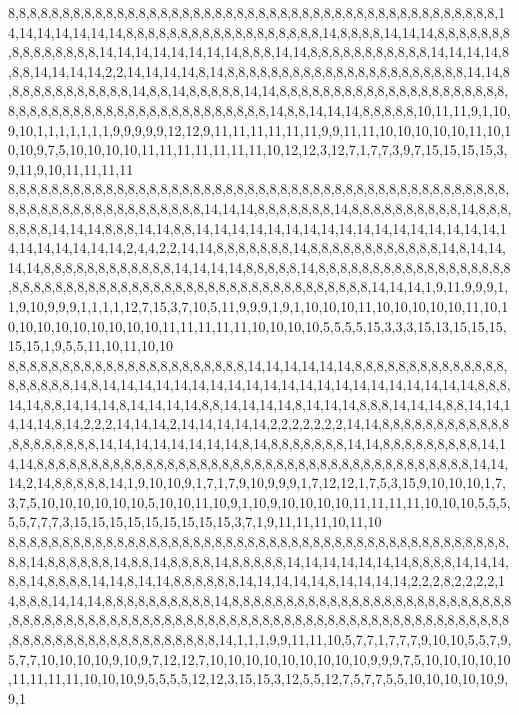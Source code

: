 8,8,8,8,8,8,8,8,8,8,8,8,8,8,8,8,8,8,8,8,8,8,8,8,8,8,8,8,8,8,8,8,8,8,8,8,8,8,8,8,8,8,8,8,8,14,14,14,14,14,14,14,8,8,8,8,8,8,8,8,8,8,8,8,8,8,8,8,8,8,14,8,8,8,8,14,14,14,8,8,8,8,8,8,8,8,8,8,8,8,8,8,8,14,14,14,14,14,14,14,14,8,8,8,14,14,8,8,8,8,8,8,8,8,8,8,8,14,14,14,14,8,8,8,14,14,14,14,2,2,14,14,14,14,8,14,8,8,8,8,8,8,8,8,8,8,8,8,8,8,8,8,8,8,8,8,8,8,14,14,8,8,8,8,8,8,8,8,8,8,8,8,14,8,8,14,8,8,8,8,8,14,14,8,8,8,8,8,8,8,8,8,8,8,8,8,8,8,8,8,8,8,8,8,8,8,8,8,8,8,8,8,8,8,8,8,8,8,8,8,8,8,8,8,8,8,8,8,14,8,8,14,14,14,8,8,8,8,8,10,11,11,9,1,10,9,10,1,1,1,1,1,1,1,9,9,9,9,9,12,12,9,11,11,11,11,11,11,9,9,11,11,10,10,10,10,10,11,10,10,10,9,7,5,10,10,10,10,11,11,11,11,11,11,11,10,12,12,3,12,7,1,7,7,3,9,7,15,15,15,15,3,9,11,9,10,11,11,11,11
8,8,8,8,8,8,8,8,8,8,8,8,8,8,8,8,8,8,8,8,8,8,8,8,8,8,8,8,8,8,8,8,8,8,8,8,8,8,8,8,8,8,8,8,8,8,8,8,8,8,8,8,8,8,8,8,8,8,8,8,8,8,8,8,14,14,14,8,8,8,8,8,8,8,14,8,8,8,8,8,8,8,8,8,8,14,8,8,8,8,8,8,8,14,14,14,8,8,8,14,14,8,8,14,14,14,14,14,14,14,14,14,14,14,14,14,14,14,14,14,14,14,14,14,14,14,14,2,4,4,2,2,14,14,8,8,8,8,8,8,8,14,8,8,8,8,8,8,8,8,8,8,8,8,14,8,14,14,14,14,8,8,8,8,8,8,8,8,8,8,8,8,14,14,14,14,8,8,8,8,8,14,8,8,8,8,8,8,8,8,8,8,8,8,8,8,8,8,8,8,8,8,8,8,8,8,8,8,8,8,8,8,8,8,8,8,8,8,8,8,8,8,8,8,8,8,8,8,8,8,8,8,8,14,14,14,1,9,11,9,9,9,1,1,9,10,9,9,9,1,1,1,1,12,7,15,3,7,10,5,11,9,9,9,1,9,1,10,10,10,11,10,10,10,10,10,11,10,10,10,10,10,10,10,10,10,10,11,11,11,11,11,10,10,10,10,5,5,5,5,15,3,3,3,15,13,15,15,15,15,15,1,9,5,5,11,10,11,10,10
8,8,8,8,8,8,8,8,8,8,8,8,8,8,8,8,8,8,8,8,8,8,14,14,14,14,14,14,8,8,8,8,8,8,8,8,8,8,8,8,8,8,8,8,8,8,8,8,14,8,14,14,14,14,14,14,14,14,14,14,14,14,14,14,14,14,14,14,14,14,14,8,8,8,14,14,8,8,14,14,14,8,14,14,14,14,8,8,14,14,14,14,8,14,14,14,8,8,8,14,14,14,8,8,14,14,14,14,14,8,14,2,2,2,14,14,14,2,14,14,14,14,14,2,2,2,2,2,2,2,14,14,8,8,8,8,8,8,8,8,8,8,8,8,8,8,8,8,8,8,8,8,14,14,14,14,14,14,14,14,8,14,8,8,8,8,8,8,8,14,14,8,8,8,8,8,8,8,8,8,14,14,14,8,8,8,8,8,8,8,8,8,8,8,8,8,8,8,8,8,8,8,8,8,8,8,8,8,8,8,8,8,8,8,8,8,8,8,8,8,8,8,8,14,14,14,2,14,8,8,8,8,8,14,1,9,10,10,9,1,7,1,7,9,10,9,9,9,1,7,12,12,1,7,5,3,15,9,10,10,10,1,7,3,7,5,10,10,10,10,10,10,5,10,10,11,10,9,1,10,9,10,10,10,10,11,11,11,11,10,10,10,5,5,5,5,5,7,7,7,3,15,15,15,15,15,15,15,15,15,3,7,1,9,11,11,11,10,11,10
8,8,8,8,8,8,8,8,8,8,8,8,8,8,8,8,8,8,8,8,8,8,8,8,8,8,8,8,8,8,8,8,8,8,8,8,8,8,8,8,8,8,8,8,8,8,8,8,14,8,8,8,8,8,8,14,8,8,14,8,8,8,8,14,8,8,8,8,8,14,14,14,14,14,14,14,8,8,8,8,14,14,14,8,8,14,8,8,8,8,14,14,8,14,14,8,8,8,8,8,8,14,14,14,14,14,8,14,14,14,14,2,2,2,8,2,2,2,2,14,8,8,8,14,14,14,8,8,8,8,8,8,8,8,8,8,14,8,8,8,8,8,8,8,8,8,8,8,8,8,8,8,8,8,8,8,8,8,8,8,8,8,8,8,8,8,8,8,8,8,8,8,8,8,8,8,8,8,8,8,8,8,8,8,8,8,8,8,8,8,8,8,8,8,8,8,8,8,8,8,8,8,8,8,8,8,8,8,8,8,8,8,8,8,8,8,8,8,8,8,8,8,8,8,8,8,8,8,14,1,1,1,9,9,11,11,10,5,7,7,1,7,7,7,9,10,10,5,5,7,9,5,7,7,10,10,10,10,9,10,9,7,12,12,7,10,10,10,10,10,10,10,10,10,9,9,9,7,5,10,10,10,10,10,11,11,11,11,10,10,10,9,5,5,5,5,12,12,3,15,15,3,12,5,5,12,7,5,7,7,5,5,10,10,10,10,10,9,9,1
